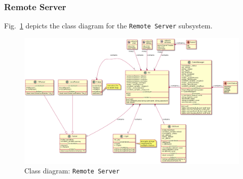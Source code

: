 \subsubsection{Remote Server}
\label{sec:remote-server-class}
%
Fig.~\ref{fig:class-diag-rs} depicts the class diagram for the \texttt{Remote
  Server} subsystem.
%
\begin{figure}[htb!]
\centering
    \includegraphics[width=1.0\columnwidth]{./img/class-diag-rs-hugo.png}
  \caption{Class diagram: \texttt{Remote Server}}%
\label{fig:class-diag-rs}
\end{figure}

